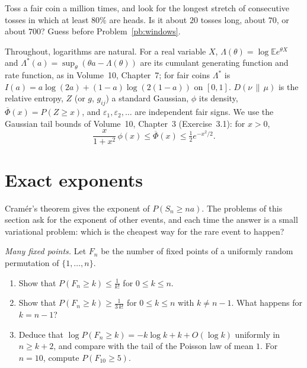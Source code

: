 \begin{think}
Toss a fair coin a million times, and look for the longest stretch of consecutive tosses in which at least $80\%$ are heads. Is it about $20$ tosses long, about $70$,
or about $700$? Guess before Problem~\ref{pb:windows}.
\end{think}

Throughout, logarithms are natural. For a real variable $X$, $\Lambda(\theta)=\log\mathbb Ee^{\theta X}$ and $\Lambda^*(a)=\sup_\theta(\theta a-\Lambda(\theta))$ are its cumulant
generating function and rate function, as in Volume~10, Chapter~7; for fair coins $\Lambda^*$ is $I(a)=a\log(2a)+(1-a)\log(2(1-a))$ on $[0,1]$. $D(\nu\,\|\,\mu)$ is the
relative entropy, $Z$ (or $g$, $g_{ij}$) a standard Gaussian, $\phi$ its density, $\overline\Phi(x)=P(Z\ge x)$, and $\varepsilon_1,\varepsilon_2,\dots$ are independent fair
signs. We use the Gaussian tail bounds of Volume~10, Chapter~3 (Exercise~3.1): for $x>0$,
\begin{equation}\label{eq:p3gausstail}
\frac x{1+x^2}\,\phi(x)\le\overline\Phi(x)\le\tfrac12e^{-x^2/2}.
\end{equation}

\section{Exact exponents}

Cram\'er's theorem gives the exponent of $P(S_n\ge na)$. The problems of this section ask for the exponent of other events, and each time the answer is a small
variational problem: which is the cheapest way for the rare event to happen?

\begin{exercise}[$\star$]\label{pb:fixedtail}
\emph{Many fixed points.} Let $F_n$ be the number of fixed points of a uniformly random permutation of $\{1,\dots,n\}$.
\begin{enumerate}[label=(\alph*)]
\item Show that $P(F_n\ge k)\le\frac1{k!}$ for $0\le k\le n$.
\item Show that $P(F_n\ge k)\ge\frac1{3\,k!}$ for $0\le k\le n$ with $k\ne n-1$. What happens for $k=n-1$?
\item Deduce that $\log P(F_n\ge k)=-k\log k+k+O(\log k)$ uniformly in $n\ge k+2$, and compare with the tail of the Poisson law of mean $1$. For $n=10$, compute
$P(F_{10}\ge5)$.
\end{enumerate}
\end{exercise}

